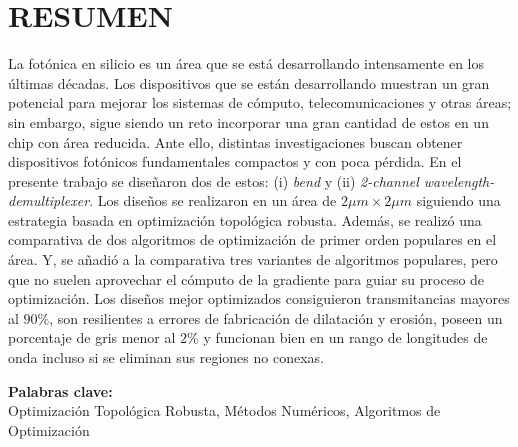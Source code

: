 \chapter*{\center \Large \vspace{-4.5cm} RESUMEN}

La fotónica en silicio es un área que se está desarrollando intensamente en los últimas décadas.
Los dispositivos que se están desarrollando muestran un gran potencial para mejorar
los sistemas de cómputo, telecomunicaciones y otras áreas;
sin embargo, sigue siendo un reto incorporar una gran cantidad de estos en un chip con área reducida.
Ante ello, distintas investigaciones buscan obtener dispositivos fotónicos fundamentales 
compactos y con poca pérdida. 
En el presente trabajo se diseñaron dos de estos: (i) \emph{bend} y (ii) \emph{2-channel wavelength-demultiplexer}.
Los diseños se realizaron en un área de $2 \mu m \times 2 \mu m$
siguiendo una estrategia basada en optimización topológica robusta.
Además, se realizó una comparativa de dos algoritmos de optimización de primer orden populares en el área.
Y, se añadió a la comparativa tres variantes de algoritmos populares, pero que no suelen
aprovechar el cómputo de la gradiente para guiar su proceso de optimización.
Los diseños mejor optimizados consiguieron transmitancias mayores al $90 \%$, son resilientes a errores
de fabricación de dilatación y erosión, poseen un porcentaje de gris menor al $2 \%$
y  funcionan bien en un rango de longitudes de onda incluso si se eliminan sus
regiones no conexas.

\noindent \textbf{Palabras clave:}\\
\noindent Optimización Topológica Robusta, Métodos Numéricos, Algoritmos de Optimización
